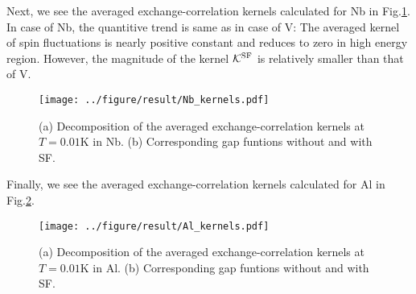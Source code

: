 Next, we see the averaged exchange-correlation kernels calculated for Nb in Fig.\ref{fig:Nbaveker}.
In case of Nb, the quantitive trend is same as in case of V: The averaged kernel of spin fluctuations
is nearly positive constant and reduces to zero in high energy region.
However, the magnitude of the kernel $\mathcal K^{\rm SF}$ is relatively smaller than that of V.
%
\begin{figure}[h]
	\centering
	\texttt{[image: ../figure/result/Nb\_kernels.pdf]}
	\caption{(a) Decomposition of the averaged exchange-correlation kernels
		at $T=0.01$K in Nb. (b) Corresponding gap funtions without 
	and with SF.}
	\label{fig:Nbaveker}
\end{figure}
%

Finally, we see the averaged exchange-correlation kernels calculated for Al in Fig.\ref{fig:Alaveker}.
%
\begin{figure}[h]
	\centering
	\texttt{[image: ../figure/result/Al\_kernels.pdf]}
	\caption{(a) Decomposition of the averaged exchange-correlation kernels
		at $T=0.01$K in Al. (b) Corresponding gap funtions without 
	and with SF.}
	\label{fig:Alaveker}
\end{figure}
%
%
%


